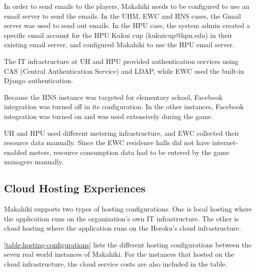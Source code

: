 In order to send emails to the players, Makahiki needs to be configured to use an email server to send the emails. In the UHM, EWC and HNS cases, the Gmail server was used to send out emails. In the HPU case, the system admin created a specific email account for the HPU Kukui cup (kukuicup@hpu.edu) in their existing email server, and configured Makahiki to use the HPU email server. 

The IT infrastructure at UH and HPU provided authentication services using CAS (Central Authentication Service) and LDAP, while EWC used the built-in Django authentication.  

Because the HNS instance was targeted for elementary school, Facebook integration was turned off in its configuration. In the other instances, Facebook integration was turned on and was used extensively during the game.

UH and HPU used different metering infrastructure, and EWC collected their resource data manually.  Since the EWC
residence halls did not have internet-enabled meters, resource consumption data had to be entered by
the game managers manually.

\subsection{Cloud Hosting Experiences}
\label{section:cloud-hosting}

Makahiki supports two types of hosting configurations. One is local hosting where the application runs on the organization's own IT infrastructure. The other is cloud hosting where the application runs on the Heroku's cloud infrastructure.

\autoref{table:hosting-configurations} lists the different hosting configurations between the seven real world instances of Makahiki. For the instances that hosted on the cloud infrastructure, the cloud service costs are also included in the table.  

